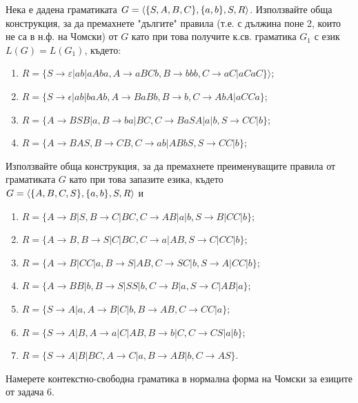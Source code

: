 \begin{problem}
  Нека е дадена граматиката  $G = \langle{\{S,A,B,C\}, \{a,b\}, S, R}\rangle$.
  Използвайте обща конструкция, за да премахнете "дългите" правила 
  (т.е. с дължина поне 2, които не са в н.ф. на Чомски) от $ G$ като при това получите к.св. граматика $G_1$ 
  с език $L(G)=L(G_1)$, където:
  \begin{enumerate}
  \item
    $R = \{S \rightarrow \varepsilon|ab|aAba, A\rightarrow aBCb, B\rightarrow bbb, C\rightarrow aC\vert aCaC\}\rangle$;
  \item
    $R = \{S \rightarrow \epsilon|ab|baAb, A\rightarrow BaBb,B\rightarrow b,C\rightarrow AbA\vert aCCa\}$;
  \item
    $R = \{A\rightarrow BSB|a,B\rightarrow ba|BC,C\rightarrow BaSA|a|b,S\rightarrow CC|b\}$;
  \item
    $R = \{A\rightarrow BAS,B\rightarrow CB,C\rightarrow ab|ABbS,S\rightarrow CC|b\}$;
  \end{enumerate}
\end{problem}


\begin{problem}
  Използвайте обща конструкция, за да премахнете преименуващите правила от граматиката $G$ като при това запазите езика,
  където $G = \langle{\{A,B,C,S\},\{a,b\}, S, R}\rangle$ и
  \begin{enumerate}
  \item
    $R = \{A\rightarrow B|S,B\rightarrow C|BC,C\rightarrow AB|a|b,S\rightarrow B|CC|b\}$;
  \item
    $R = \{A\rightarrow B,B\rightarrow S|C|BC,C\rightarrow a|AB,S\rightarrow C|CC|b\}$;
  \item
    $R = \{A\rightarrow B|CC|a,B\rightarrow S|AB,C\rightarrow SC|b,S\rightarrow A|CC|b\}$;
  \item
    $R = \{A\rightarrow BB|b,B\rightarrow S|SS|b,C\rightarrow B|a,S\rightarrow C|AB|a\}$;
  \item
    $R = \{S\rightarrow A|a,A\rightarrow B|C|b, B\rightarrow AB, C\rightarrow CC|a\}$;
  \item
    $R = \{S\rightarrow A|B, A\rightarrow a|C|AB, B\rightarrow b|C, C\rightarrow CS|a|b\}$;
  \item
    $R = \{S\rightarrow A|B|BC, A\rightarrow C|a, B\rightarrow AB|b, C\rightarrow AS\}$. 
  \end{enumerate}
\end{problem}

\begin{problem}
  Намерете контекстно-свободна граматика в нормална форма на Чомски за езиците от задача 6.
  
\end{problem}


